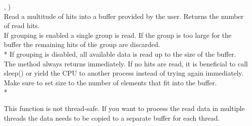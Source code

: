 \device,    )\\
Read a multitude of hits into a buffer provided by the user. Returns the number of read hits.\\
If grouping is enabled a single group is read. 
If the group is too large for the buffer the remaining hits of the group are discarded.\\*
If grouping is disabled, all available data is read up to the size of the buffer. \\
The method always returns immediately. If no hits are read, it is beneficial to call \textsf{sleep()} 
or yield the CPU to another process instead of trying again immediately.\\
Make sure to set \textsf{size} to the number of elements that fit into the buffer.\\*

This function is not thread-safe. 
If you want to process the read data in multiple threads the data needs to be copied to a separate buffer for each thread.
